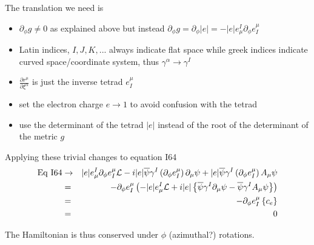 \documentclass[aps,preprint,preprintnumbers,nofootinbib,showpacs,prd]{revtex4-1}
\newcommand{\bit}{\begin{itemize}}
\newcommand{\eit}{\end{itemize}}
\newcommand{\nbea}{\begin{eqnarray*}}
\newcommand{\neea}{\end{eqnarray*}}
\begin{document}
The translation we need is
\bit
\item $\partial_\phi g \neq 0$ as explained above but instead $\partial_\phi g = \partial_\phi |e| = -|e| e^I_\mu \partial_\phi e^\mu_I$
\item Latin indices, $I,J,K,...$ always indicate flat space while greek indices indicate curved space/coordinate system, thus $\gamma^\alpha \rightarrow \gamma^I$
\item $\frac{\partial r^\mu}{\partial \xi^\alpha}$ is just the inverse tetrad $e^\mu_I$
\item set the electron charge $e \rightarrow 1$ to avoid confusion with the tetrad
\item use the determinant of the tetrad $|e|$ instead of the root of the determinant of the metric $g$
\eit

Applying these trivial changes to equation I64
%
\nbea
{\rm Eq~I64} & \rightarrow & |e| e^I_\mu \partial_\phi e^\mu_I \mathcal{L} - i |e| \overline \psi \gamma^I \left ( \partial_\phi e^\mu_I \right )  \partial_\mu \psi + |e| \overline \psi \gamma^I \left ( \partial_\phi e^\mu_I \right ) A_\mu \psi \\
& = & -\partial_\phi e^\mu_I \left ( -|e| e^I_\mu \mathcal{L} + i |e| \left \{ \overline \psi \gamma^I \partial_\mu \psi - \overline \psi \gamma^I A_\mu \psi \right \} \right ) \\
& = & -\partial_\phi e^\mu_I \left \{ c_e \right \} \\
& = & 0
\neea
%

The Hamiltonian is thus conserved under $\phi$ (azimuthal?) rotations.
\end{document}
